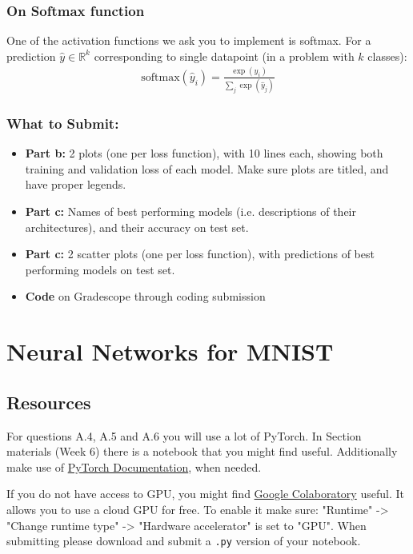 \documentclass{article}
\begin{document}
\begin{aprob}
    \subsubsection*{On Softmax function}
    One of the activation functions we ask you to implement is softmax. For a prediction $\hat{y} \in \mathbb{R}^k$ corresponding to single datapoint (in a problem with $k$ classes):
    \begin{align*}
        \text{softmax}(\hat{y}_i) = \frac{\exp(\hat{y}_i)}{\sum_j \exp(\hat{y}_j)}
    \end{align*}
    
    \subsubsection*{What to Submit:}
    \begin{itemize}
        \item \textbf{Part b:} 2 plots (one per loss function), with 10 lines each, showing both training and validation loss of each model. Make sure plots are titled, and have proper legends.
        \item \textbf{Part c:} Names of best performing models (i.e. descriptions of their architectures), and their accuracy on test set.
        \item \textbf{Part c:} 2 scatter plots (one per loss function), with predictions of best performing models on test set.
        \item \textbf{Code} on Gradescope through coding submission
    \end{itemize}
\end{aprob}

\section*{Neural Networks for MNIST}

    \subsection*{Resources}
        For questions A.4, A.5 and A.6 you will use a lot of PyTorch.
        In Section materials (Week 6) there is a notebook that you might find useful.
        Additionally make use of \href{https://pytorch.org/docs/stable/index.html}{PyTorch Documentation}, when needed.
        
        If you do not have access to GPU, you might find \href{https://colab.research.google.com/}{Google Colaboratory} useful.
        It allows you to use a cloud GPU for free.
        To enable it make sure: "Runtime" -> "Change runtime type" -> "Hardware accelerator" is set to "GPU". When submitting please download and submit a \texttt{.py} version of your notebook.
\end{document}
